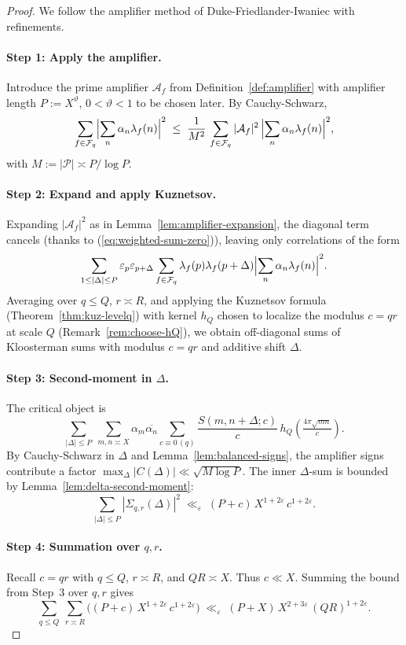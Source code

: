 \documentclass[11pt]{article}
\def\eqref#1{(\ref{#1})}%
\theoremstyle{definition}
\theoremstyle{remark}
\numberwithin{equation}{part}
\begin{document}
\begin{proof}
	We follow the amplifier method of Duke-Friedlander-Iwaniec with refinements.

	\paragraph{Step 1: Apply the amplifier.}
	Introduce the prime amplifier $\mathcal A_f$ from Definition~\ref{def:amplifier} with amplifier length $P:=X^\vartheta$, $0<\vartheta<1$ to be chosen later.
	By Cauchy-Schwarz,
	\[
		\sum_{f\in\mathcal F_q}\Bigl|\sum_{n}\alpha_n\lambda_f(n)\Bigr|^2
		\;\le\;
		\frac{1}{M^2}\,\sum_{f\in\mathcal F_q}|\mathcal A_f|^2
		\,\Bigl|\sum_{n}\alpha_n\lambda_f(n)\Bigr|^2,
	\]
	with $M:=|\mathcal P|\asymp P/\log P$.

	\paragraph{Step 2: Expand and apply Kuznetsov.}
	Expanding $|\mathcal A_f|^2$ as in Lemma~\ref{lem:amplifier-expansion}, the diagonal term cancels (thanks to \eqref{eq:weighted-sum-zero}), leaving only correlations of the form
	\[
		\sum_{1\le|\Delta|\le P} \varepsilon_p\varepsilon_{p+\Delta}
		\sum_{f\in\mathcal F_q} \lambda_f(p)\lambda_f(p+\Delta)
		\Bigl|\sum_{n}\alpha_n\lambda_f(n)\Bigr|^2.
	\]
	Averaging over $q\le Q$, $r\asymp R$, and applying the Kuznetsov formula (Theorem~\ref{thm:kuz-levelq}) with kernel $h_Q$ chosen to localize the modulus $c=qr$ at scale $Q$ (Remark~\ref{rem:choose-hQ}), we obtain off-diagonal sums of Kloosterman sums with modulus $c=qr$ and additive shift $\Delta$.

	\paragraph{Step 3: Second-moment in $\Delta$.}
	The critical object is
	\[
		\sum_{|\Delta|\le P}\ \sum_{m,n\asymp X}\alpha_m\overline{\alpha_n}
		\sum_{c\equiv0\,(q)} \frac{S(m,n+\Delta;c)}{c}\,
		h_Q\!\left(\tfrac{4\pi\sqrt{mn}}{c}\right).
	\]
	By Cauchy-Schwarz in $\Delta$ and Lemma~\ref{lem:balanced-signs}, the amplifier signs contribute a factor $\max_\Delta|C(\Delta)|\ll \sqrt{M\log P}$.
	The inner $\Delta$-sum is bounded by Lemma~\ref{lem:delta-second-moment}:
	\[
		\sum_{|\Delta|\le P}|\Sigma_{q,r}(\Delta)|^2
		\;\ll_\varepsilon\; (P+c)\,X^{1+2\varepsilon}\,c^{1+2\varepsilon}.
	\]

	\paragraph{Step 4: Summation over $q,r$.}
	Recall $c=qr$ with $q\le Q$, $r\asymp R$, and $QR\asymp X$.
	Thus $c\ll X$.
	Summing the bound from Step~3 over $q,r$ gives
	\[
		\sum_{q\le Q}\ \sum_{r\asymp R}
		\bigl((P+c)\,X^{1+2\varepsilon}\,c^{1+2\varepsilon}\bigr)
		\;\ll_\varepsilon\; (P+X)\,X^{2+3\varepsilon}\,(QR)^{1+2\varepsilon}.
	\]


\end{proof}
\end{document}
